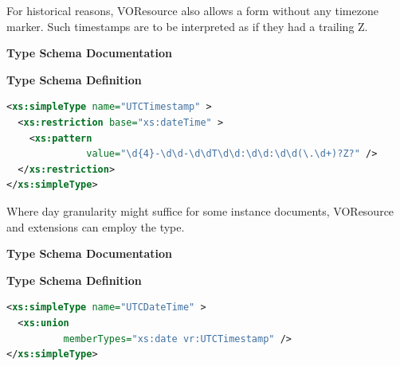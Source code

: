 \documentclass[11pt,a4paper]{ivoa}
\begin{document}
For historical reasons, VOResource also allows a form without any
timezone marker.  Such timestamps are to be interpreted as  if they had
a trailing Z.

\begin{generated}
\begingroup
      	\renewcommand*\descriptionlabel[1]{%
      	\hbox to 5.5em{\emph{#1}\hfil}}\vspace{2ex}\noindent\textbf{ Type Schema Documentation}


\vspace{1ex}\noindent\textbf{ Type Schema Definition}

\begin{lstlisting}[language=XML,basicstyle=\footnotesize]
<xs:simpleType name="UTCTimestamp" >
  <xs:restriction base="xs:dateTime" >
    <xs:pattern
              value="\d{4}-\d\d-\d\dT\d\d:\d\d:\d\d(\.\d+)?Z?" />
  </xs:restriction>
</xs:simpleType>
\end{lstlisting}\endgroup
\end{generated}



Where day granularity might suffice for some instance documents, 
VOResource and extensions can
employ the  type.

\begin{generated}
\begingroup
      	\renewcommand*\descriptionlabel[1]{%
      	\hbox to 5.5em{\emph{#1}\hfil}}\vspace{2ex}\noindent\textbf{ Type Schema Documentation}


\vspace{1ex}\noindent\textbf{ Type Schema Definition}

\begin{lstlisting}[language=XML,basicstyle=\footnotesize]
<xs:simpleType name="UTCDateTime" >
  <xs:union
          memberTypes="xs:date vr:UTCTimestamp" />
</xs:simpleType>
\end{lstlisting}\endgroup
\end{generated}
\end{document}
